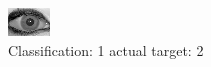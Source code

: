 \begin{figure}[h!]
\begin{center}
\includegraphics[width=0.60\columnwidth]{figures/ID2000_class_1_target_2.png}
\end{center}
\caption{ Classification: 1 actual target: 2}
\label{fig:ID2000_class_1_target_2}
\end{figure}
